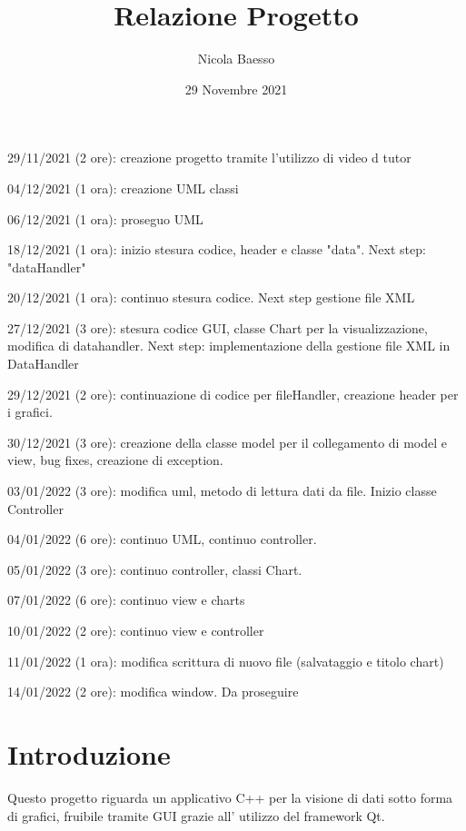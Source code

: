 \documentclass[10pt]{article}
\author{Nicola Baesso}
\title{Relazione Progetto}
\date{29 Novembre 2021}
\begin{document}
	\setlength{\baselineskip}{13 pt}
	
	\maketitle
	
	
	29/11/2021 (2 ore): creazione progetto tramite l'utilizzo di video d tutor
	
	04/12/2021 (1 ora): creazione UML classi
	
	06/12/2021 (1 ora): proseguo UML
	
	18/12/2021 (1 ora): inizio stesura codice, header e classe "data". Next step: "dataHandler"
	
	20/12/2021 (1 ora): continuo stesura codice. Next step gestione file XML
	
	27/12/2021 (3 ore): stesura codice GUI, classe Chart per la visualizzazione, modifica di datahandler. Next step: implementazione della gestione file XML in DataHandler
	
	29/12/2021 (2 ore): continuazione di codice per fileHandler, creazione header per i grafici.
     
    30/12/2021 (3 ore): creazione della classe model per il collegamento di model e view, bug fixes, creazione di exception.
    
    03/01/2022 (3 ore): modifica uml, metodo di lettura dati da file. Inizio classe Controller
    
    04/01/2022 (6 ore): continuo UML, continuo controller.
    
    05/01/2022 (3 ore): continuo controller, classi Chart.
    
    07/01/2022 (6 ore): continuo view e charts
    
    10/01/2022 (2 ore): continuo view e controller
    
    11/01/2022 (1 ora): modifica scrittura di nuovo file (salvataggio e titolo chart)
    
    14/01/2022 (2 ore): modifica window. Da proseguire
    
    \newpage
    \tableofcontents
    \newpage
    \section{Introduzione}
     Questo progetto riguarda un applicativo C++ per la visione di dati sotto forma di grafici, fruibile tramite GUI grazie all' utilizzo del framework Qt.
\end{document}
